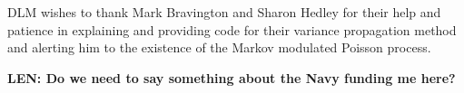 \documentclass[a4paper,12pt]{article}
\begin{document}
DLM wishes to thank Mark Bravington and Sharon Hedley for their help and patience in explaining and providing code for their variance propagation method and alerting him to the existence of the Markov modulated Poisson process.

\textbf{LEN: Do we need to say something about the Navy funding me here?}


\newpage



\newpage



%
%
%
%
\end{document}
